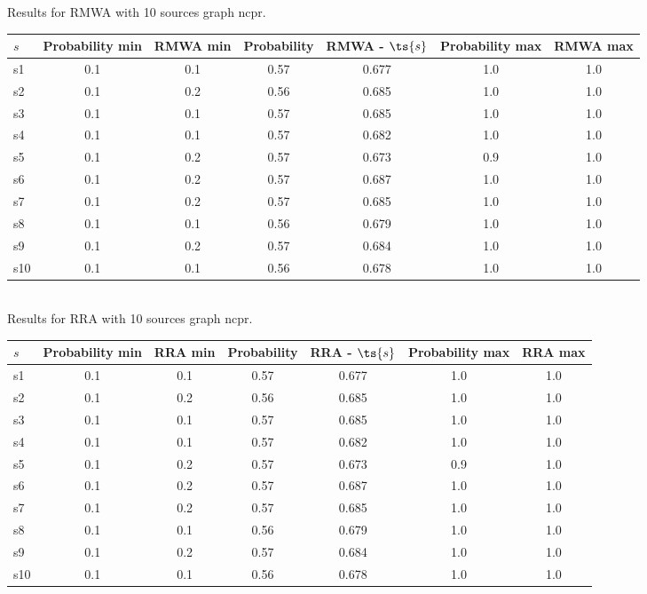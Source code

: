 \documentclass{article}
\begin{document}
\noindent Results for RMWA with 10 sources graph ncpr.

\noindent\begin{tabular}{|l|c|c|c|c|c|c|}
\hline
$s$& Probability min & RMWA min & Probability & RMWA - $\ts{s}$ & Probability max & RMWA max\\
\hline
s1 &0.1 & 0.1 & 0.57 & 0.677 & 1.0 & 1.0\\
\hline
s2 &0.1 & 0.2 & 0.56 & 0.685 & 1.0 & 1.0\\
\hline
s3 &0.1 & 0.1 & 0.57 & 0.685 & 1.0 & 1.0\\
\hline
s4 &0.1 & 0.1 & 0.57 & 0.682 & 1.0 & 1.0\\
\hline
s5 &0.1 & 0.2 & 0.57 & 0.673 & 0.9 & 1.0\\
\hline
s6 &0.1 & 0.2 & 0.57 & 0.687 & 1.0 & 1.0\\
\hline
s7 &0.1 & 0.2 & 0.57 & 0.685 & 1.0 & 1.0\\
\hline
s8 &0.1 & 0.1 & 0.56 & 0.679 & 1.0 & 1.0\\
\hline
s9 &0.1 & 0.2 & 0.57 & 0.684 & 1.0 & 1.0\\
\hline
s10 &0.1 & 0.1 & 0.56 & 0.678 & 1.0 & 1.0\\
\hline
\end{tabular}\\

\noindent Results for RRA with 10 sources graph ncpr.

\noindent\begin{tabular}{|l|c|c|c|c|c|c|}
\hline
$s$& Probability min & RRA min & Probability & RRA - $\ts{s}$ & Probability max & RRA max\\
\hline
s1 &0.1 & 0.1 & 0.57 & 0.677 & 1.0 & 1.0\\
\hline
s2 &0.1 & 0.2 & 0.56 & 0.685 & 1.0 & 1.0\\
\hline
s3 &0.1 & 0.1 & 0.57 & 0.685 & 1.0 & 1.0\\
\hline
s4 &0.1 & 0.1 & 0.57 & 0.682 & 1.0 & 1.0\\
\hline
s5 &0.1 & 0.2 & 0.57 & 0.673 & 0.9 & 1.0\\
\hline
s6 &0.1 & 0.2 & 0.57 & 0.687 & 1.0 & 1.0\\
\hline
s7 &0.1 & 0.2 & 0.57 & 0.685 & 1.0 & 1.0\\
\hline
s8 &0.1 & 0.1 & 0.56 & 0.679 & 1.0 & 1.0\\
\hline
s9 &0.1 & 0.2 & 0.57 & 0.684 & 1.0 & 1.0\\
\hline
s10 &0.1 & 0.1 & 0.56 & 0.678 & 1.0 & 1.0\\
\hline
\end{tabular}\\
\end{document}
